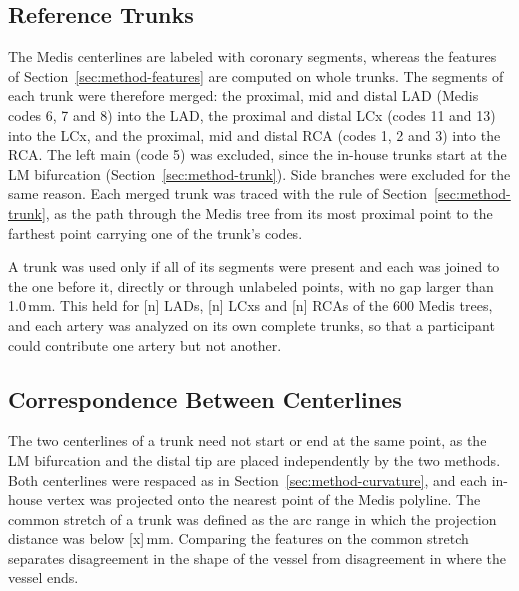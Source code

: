 \subsection{Reference Trunks}
\label{sec:method-medis-trunks}

The Medis centerlines are labeled with coronary segments, whereas the features of Section~\ref{sec:method-features} are computed on whole trunks.
The segments of each trunk were therefore merged: the proximal, mid and distal LAD (Medis codes 6, 7 and 8) into the LAD, the proximal and distal LCx (codes 11 and 13) into the LCx, and the proximal, mid and distal RCA (codes 1, 2 and 3) into the RCA.
The left main (code 5) was excluded, since the in-house trunks start at the LM bifurcation (Section~\ref{sec:method-trunk}).
Side branches were excluded for the same reason.
Each merged trunk was traced with the rule of Section~\ref{sec:method-trunk}, as the path through the Medis tree from its most proximal point to the farthest point carrying one of the trunk's codes.

A trunk was used only if all of its segments were present and each was joined to the one before it, directly or through unlabeled points, with no gap larger than 1.0\,mm.
This held for [n] LADs, [n] LCxs and [n] RCAs of the 600 Medis trees, and each artery was analyzed on its own complete trunks, so that a participant could contribute one artery but not another.

\subsection{Correspondence Between Centerlines}
\label{sec:method-medis-match}

The two centerlines of a trunk need not start or end at the same point, as the LM bifurcation and the distal tip are placed independently by the two methods.
Both centerlines were respaced as in Section~\ref{sec:method-curvature}, and each in-house vertex was projected onto the nearest point of the Medis polyline.
The common stretch of a trunk was defined as the arc range in which the projection distance was below [x]\,mm.
Comparing the features on the common stretch separates disagreement in the shape of the vessel from disagreement in where the vessel ends.

